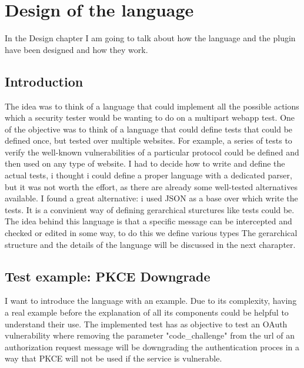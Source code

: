 \chapter{Design of the language}
In the Design chapter I am going to talk about how the language and the plugin have been designed and how they work.

\section{Introduction}
The idea was to think of a language that could implement all the possible actions which a security tester would be wanting to do on a multipart webapp test. One of the objective was to think of a language that could define tests that could be defined once, but tested over multiple websites. For example, a series of tests to verify the well-known vulnerabilities of a particular protocol could be defined and then used on any type of website.
I had to decide how to write and define the actual tests, i thought i could define a proper language with a dedicated parser, but it was not worth the effort, as there are already some well-tested alternatives available. I found a great alternative: i used JSON as a base over which write the tests. It is a convinient way of defining gerarchical sturctures like tests could be.
The idea behind this language is that a specific message can be intercepted and checked or edited in some way, to do this we define various types
The gerarchical structure and the details of the language will be discussed in the next charapter.

\section{Test example: PKCE Downgrade}
I want to introduce the language with an example. Due to its complexity, having a real example before the explanation of all its components could be helpful to understand their use.
The implemented test has as objective to test an OAuth vulnerability where removing the parameter "code\_challenge" from the url of an authorization request message will be downgrading the authentication proces in a way that PKCE will not be used if the service is vulnerable.


